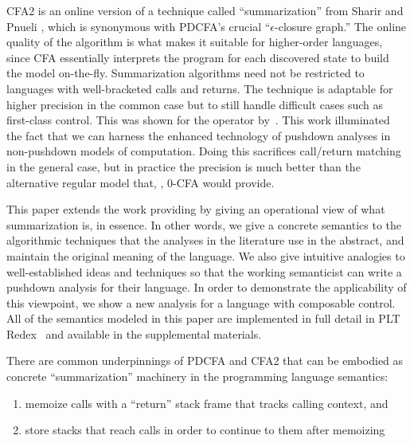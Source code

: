 CFA2 is an online version of a technique called ``summarization'' from Sharir and Pnueli \citep[Chapter 7]{local:muchnick:jones:flow-analysis:1981}, which is synonymous with PDCFA's crucial ``$\epsilon$-closure graph.''
%
The online quality of the algorithm is what makes it suitable for higher-order languages, since CFA essentially interprets the program for each discovered state to build the model on-the-fly.
%
Summarization algorithms need not be restricted to languages with well-bracketed calls and returns.
%
The technique is adaptable for higher precision in the common case but to still handle difficult cases such as first-class control.
%
This was shown for the  operator by~\citet{ianjohnson:Vardoulakis2011Pushdown}.
%
This work illuminated the fact that we can harness the enhanced technology of pushdown analyses in non-pushdown models of computation.
%
Doing this sacrifices call/return matching in the general case, but in practice the precision is much better than the alternative regular model that, \eg, 0-CFA would provide.

This paper extends the work providing  by giving an operational view of what summarization is, in essence.
%
In other words, we give a concrete semantics to the algorithmic techniques that the analyses in the literature use in the abstract, and maintain the original meaning of the language.
%
We also give intuitive analogies to well-established ideas and techniques so that the working semanticist can write a pushdown analysis for their language.
%
In order to demonstrate the applicability of this viewpoint, we show a new analysis for a language with composable control.
%
All of the semantics modeled in this paper are implemented in full detail in PLT Redex~\citep{ianjohnson:Felleisen:2009:SEP:1795772} and available in the supplemental materials.

There are common underpinnings of PDCFA and CFA2 that can be embodied as concrete ``summarization'' machinery in the programming language semantics: 
\begin{enumerate}
\item{memoize calls with a ``return'' stack frame that tracks calling context, and}
\item{store stacks that reach calls in order to continue to them after memoizing}
\end{enumerate}

